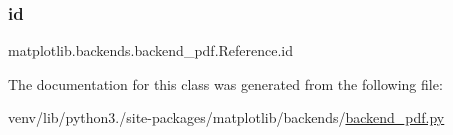 \subsubsection{\texorpdfstring{id}{id}}
{\footnotesize\ttfamily matplotlib.\+backends.\+backend\+\_\+pdf.\+Reference.\+id}



The documentation for this class was generated from the following file\+:\begin{DoxyCompactItemize}
\item 
venv/lib/python3./site-\/packages/matplotlib/backends/\hyperlink{backend__pdf_8py}{backend\+\_\+pdf.\+py}\end{DoxyCompactItemize}
